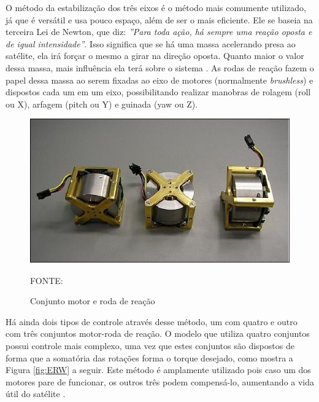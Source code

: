 \documentclass[
	12pt,				%
	openany,			%
	twoside,			%
	a4paper,			%
	english,			%
	french,				%
	spanish,			%
	brazil,				%
	oldfontcommands
	]{abntex2}
\begin{document}
O método da estabilização dos três eixos é o método mais comumente utilizado, já que é versátil e usa pouco espaço, além de ser o mais eficiente. Ele se baseia na terceira Lei de Newton, que diz: \textit{''Para toda ação, há sempre uma reação oposta e de igual intensidade''}. Isso significa que se há uma massa acelerando presa ao satélite, ela irá forçar o mesmo a girar na direção oposta. Quanto maior o valor dessa massa, mais influência ela terá sobre o sistema \cite{Ericksson}. As rodas de reação fazem o papel dessa massa ao serem fixadas ao eixo de motores (normalmente \textit{brushless}) e dispostos cada um em um eixo, possibilitando realizar manobras de rolagem (roll ou X), arfagem (pitch ou Y) e guinada (yaw ou Z).

\begin{figure}[th]
	\caption{Conjunto motor e roda de reação}
	\centering
	\includegraphics[width=0.7\linewidth]{./figs/Shelf_Reaction_Wheel}
	
	\begin{small}
		FONTE: \cite{SWR}
	\end{small}
	\label{fig:SRW}
\end{figure}

\newpage 

Há ainda dois tipos de controle através desse método, um com quatro e outro com três conjuntos motor-roda de reação. O modelo que utiliza quatro conjuntos possui controle mais complexo, uma vez que estes conjuntos são dispostos de forma que a somatória das rotações forma o torque desejado, como mostra a Figura \ref{fig:ERW} a seguir. Este método é amplamente utilizado pois caso um dos motores pare de funcionar, os outros três podem compensá-lo, aumentando a vida útil do satélite \cite{Ericksson}.
\end{document}

